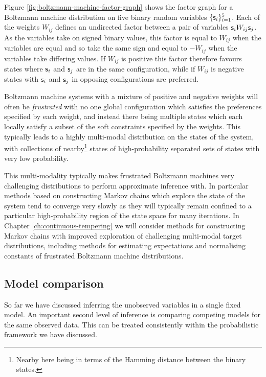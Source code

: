 Figure \ref{fig:boltzmann-machine-factor-graph} shows the factor graph for a Boltzmann machine distribution on five binary random variables $\lbrace \mathsf{s}_i \rbrace_{i=1}^5$. Each of the weights $W_{ij}$ defines an undirected factor between a pair of variables $\mathsf{s}_iW_{ij}\mathsf{s}_j$. As the variables take on signed binary values, this factor is equal to $W_{ij}$ when the variables are equal and so take the same sign and equal to $-W_{ij}$ when the variables take differing values. If $W_{ij}$ is positive this factor therefore favours states where $\mathsf{s}_i$ and $\mathsf{s}_j$ are in the same configuration, while if $W_{ij}$ is negative states with $\mathsf{s}_i$ and $\mathsf{s}_j$ in opposing configurations are preferred.

Boltzmann machine systems with a mixture of positive and negative weights will often be \emph{frustrated} with no one global configuration which satisfies the preferences specified by each weight, and instead there being multiple states which each locally satisfy a subset of the soft constraints specified by the weights. This typically leads to a highly multi-modal distribution on the states of the system, with collections of nearby\footnote{Nearby here being in terms of the Hamming distance between the binary states.} states of high-probability separated sets of states with very low probability. 

This multi-modality typically makes frustrated Boltzmann machines very challenging distributions to perform approximate inference with. In particular methods based on constructing Markov chains which explore the state of the system tend to converge very slowly as they will typically remain confined to a particular high-probability region of the state space for many iterations. In Chapter \ref{ch:continuous-tempering} we will consider methods for constructing Markov chains with improved exploration of challenging multi-modal target distributions, including methods for estimating expectations and normalising constants of frustrated Boltzmann machine distributions.

\subsection{Model comparison}

So far we have discussed inferring the unobserved variables in a single fixed model. An important second level of inference is comparing competing models for the same observed data. This can be treated consistently within the probabilistic framework we have discussed. 

